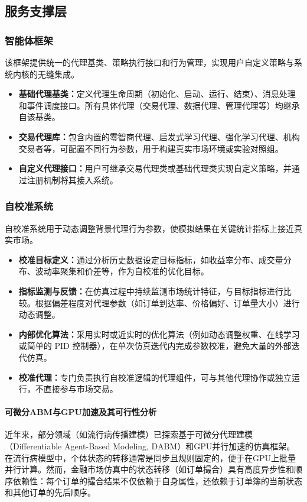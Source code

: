 \subsection{服务支撑层}

\subsubsection{智能体框架}

该框架提供统一的代理基类、策略执行接口和行为管理，实现用户自定义策略与系统内核的无缝集成。


\begin{itemize}
  \item \textbf{基础代理基类：}定义代理生命周期（初始化、启动、运行、结束）、消息处理和事件调度接口。所有具体代理（交易代理、数据代理、管理代理等）均继承自该基类。
  \item \textbf{交易代理库：}包含内置的零智商代理、启发式学习代理、强化学习代理、机构交易者等，可配置不同行为参数，用于构建真实市场环境或实验对照组。
  \item \textbf{自定义代理接口：}用户可继承交易代理类或基础代理类实现自定义策略，并通过注册机制将其接入系统。
\end{itemize}

\subsubsection{自校准系统}

自校准系统用于动态调整背景代理行为参数，使模拟结果在关键统计指标上接近真实市场。

\begin{itemize}
  \item \textbf{校准目标定义：}通过分析历史数据设定目标指标，如收益率分布、成交量分布、波动率聚集和价差等，作为自校准的优化目标。
  \item \textbf{指标监测与反馈：}在仿真过程中持续监测市场统计特征，与目标指标进行比较。根据偏差程度对代理参数（如订单到达率、价格偏好、订单量大小）进行动态调整。
  \item \textbf{内部优化算法：}采用实时或近实时的优化算法（例如动态调整权重、在线学习或简单的 PID 控制器），在单次仿真迭代内完成参数校准，避免大量的外部迭代仿真。
  \item \textbf{校准代理：}专门负责执行自校准逻辑的代理组件，可与其他代理协作或独立运行，不直接参与市场交易。
\end{itemize}


\paragraph{可微分ABM与GPU加速及其可行性分析}
近年来，部分领域（如流行病传播建模）已探索基于可微分代理建模（Differentiable Agent-Based Modeling, DABM）和GPU并行加速的仿真框架。在流行病模型中，个体状态的转移通常是同步且规则固定的，便于在GPU上批量并行计算。然而，金融市场仿真中的状态转移（如订单撮合）具有高度异步性和顺序依赖性：每个订单的撮合结果不仅依赖于自身属性，还依赖于订单簿的当前状态和其他订单的先后顺序。

